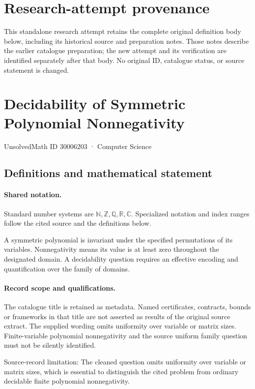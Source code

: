\documentclass[11pt]{article}
\begin{document}
\section*{Research-attempt provenance}
This standalone research attempt retains the complete original definition body below,
including its historical source and preparation notes. Those notes describe the
earlier catalogue preparation; the new attempt and its verification are identified
separately after that body. No original ID, catalogue status, or source statement is changed.

\section{Decidability of Symmetric Polynomial Nonnegativity}\label{30006203}
{\small UnsolvedMath ID 30006203 · Computer Science}
\subsection{Definitions and mathematical statement}

\paragraph{Shared notation.}Standard number systems are $\mathbb N,\mathbb Z,\mathbb Q,\mathbb R,\mathbb C$. Specialized notation and index ranges follow the cited source and the definitions below.


A symmetric polynomial is invariant under the specified permutations of its variables. Nonnegativity means its value is at least zero throughout the designated domain. A decidability question requires an effective encoding and quantification over the family of domains.
\paragraph{Record scope and qualifications.}
The catalogue title is retained as metadata. Named certificates, contracts, bounds or frameworks in that title are not asserted as results of the original source extract.
The supplied wording omits uniformity over variable or matrix sizes. Finite-variable polynomial nonnegativity and the source uniform family question must not be silently identified.

Source-record limitation: The cleaned question omits uniformity over variable or matrix sizes, which is essential to distinguish the cited problem from ordinary decidable finite polynomial nonnegativity.
\end{document}
